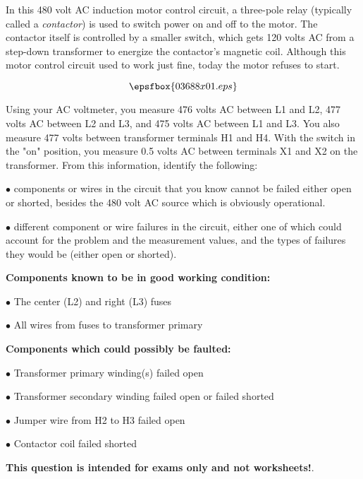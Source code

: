 

In this 480 volt AC induction motor control circuit, a three-pole relay (typically called a {\it contactor}) is used to switch power on and off to the motor.  The contactor itself is controlled by a smaller switch, which gets 120 volts AC from a step-down transformer to energize the contactor's magnetic coil.  Although this motor control circuit used to work just fine, today the motor refuses to start.

$$\epsfbox{03688x01.eps}$$

Using your AC voltmeter, you measure 476 volts AC between L1 and L2, 477 volts AC between L2 and L3, and 475 volts AC between L1 and L3.  You also measure 477 volts between transformer terminals H1 and H4.  With the switch in the "on" position, you measure 0.5 volts AC between terminals X1 and X2 on the transformer.  From this information, identify the following:

\vskip 10pt

\medskip
\item{$\bullet$}  components or wires in the circuit that you know cannot be failed either open or shorted, besides the 480 volt AC source which is obviously operational.
\vskip 40pt
\item{$\bullet$}  different component or wire failures in the circuit, either one of which could account for the problem and the measurement values, and the types of failures they would be (either open or shorted).
\medskip








\noindent
{\bf Components known to be in good working condition:}

\medskip
\item{$\bullet$} The center (L2) and right (L3) fuses
\item{$\bullet$} All wires from fuses to transformer primary
\medskip

\vskip 10pt

\goodbreak
\noindent
{\bf Components which could possibly be faulted:}

\medskip
\item{$\bullet$} Transformer primary winding(s) failed open
\item{$\bullet$} Transformer secondary winding failed open or failed shorted
\item{$\bullet$} Jumper wire from H2 to H3 failed open
\item{$\bullet$} Contactor coil failed shorted
\medskip







{\bf This question is intended for exams only and not worksheets!}.



